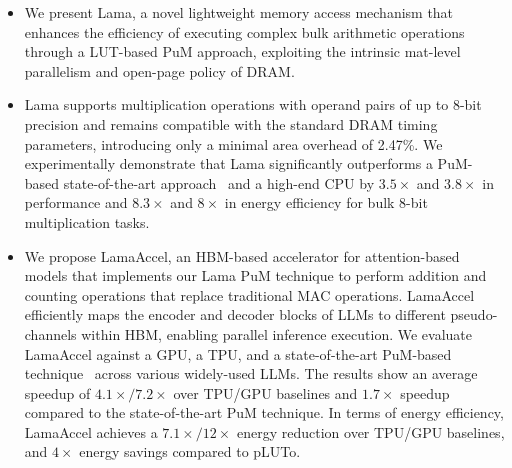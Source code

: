 \begin{itemize}

\item We present Lama, a novel lightweight memory access mechanism that enhances the efficiency of executing complex bulk arithmetic operations through a LUT-based PuM approach, exploiting the intrinsic mat-level parallelism and open-page policy of DRAM.


\item Lama supports multiplication operations with operand pairs of up to 8-bit precision and remains compatible with the standard DRAM timing parameters, introducing only a minimal area overhead of 2.47\%. We experimentally demonstrate that Lama significantly outperforms a PuM-based state-of-the-art approach~\cite{pluto} and a high-end CPU by $3.5\times$ and $3.8\times$ in performance and $8.3\times$ and $8\times$ in energy efficiency for bulk 8-bit multiplication tasks.

\item We propose LamaAccel, an HBM-based accelerator for attention-based models that implements our Lama PuM technique to perform addition and counting operations that replace traditional MAC operations. LamaAccel efficiently maps the encoder and decoder blocks of LLMs to different pseudo-channels within HBM, enabling parallel inference execution. We evaluate LamaAccel against a GPU, a TPU, and a state-of-the-art PuM-based technique~\cite{pluto} across various widely-used LLMs. The results show an average speedup of $4.1\times$$/7.2\times$ over TPU/GPU baselines and $1.7\times$ speedup compared to the state-of-the-art PuM technique. In terms of energy efficiency, LamaAccel achieves a $7.1\times$$/12\times$ energy reduction over TPU/GPU baselines, and $4\times$ energy savings compared to pLUTo.



\end{itemize}

